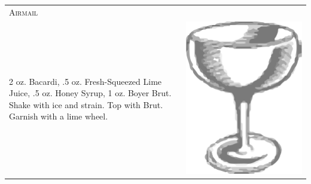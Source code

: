 \documentclass{article}
\begin{document}
\begin{tabular}{p{2in} p{0.5in}}
  \multicolumn{2}{p{3in}}{\centering\Huge\textsc{Airmail}} \\ 
  
   \vspace{-0.1in}2 oz. Bacardi, .5 oz. Fresh-Squeezed Lime Juice, .5 oz. Honey
    Syrup, 1 oz. Boyer Brut. Shake with ice and strain. Top with
    Brut. Garnish with a lime wheel. &
   \vspace{-0.1in} \includegraphics{egg_coupe.png}
\end{tabular}
\end{document}
